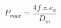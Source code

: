 \documentclass[12pt]{article}
\begin{document}
\begin{displaymath}
P_{max} = \frac {4f . z . e_a} {D_m}
\end{displaymath}
\end{document}
